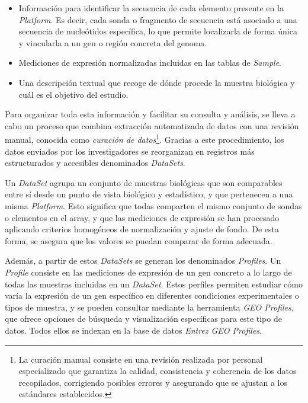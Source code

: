 \begin{itemize}
\item Información para identificar la secuencia de cada elemento presente en la \textit{Platform}. Es decir, cada sonda o fragmento de secuencia está asociado a 
una secuencia de nucleótidos específica, lo que permite localizarla de forma única y vincularla a un gen o región concreta del genoma.
\item Mediciones de expresión normalizadas incluidas en las tablas de \textit{Sample}.
\item Una descripción textual que recoge de dónde procede la muestra biológica y cuál es el objetivo del estudio.
\end{itemize}

Para organizar toda esta información y facilitar su consulta y análisis, se lleva a cabo un proceso que combina extracción automatizada de datos con una revisión 
manual, conocida como \textit{curación de datos}\footnote{La curación manual consiste en una revisión realizada por personal especializado que garantiza la calidad, 
consistencia y coherencia de los datos recopilados, corrigiendo posibles errores y asegurando que se ajustan a los estándares establecidos.}. Gracias a este procedimiento, 
los datos enviados por los investigadores se reorganizan en registros más estructurados y accesibles denominados \textit{DataSets}. \newline

Un \textit{DataSet} agrupa un conjunto de muestras biológicas que son comparables entre sí desde un punto de vista biológico y estadístico, y que pertenecen a una 
misma \textit{Platform}. Esto significa que todas comparten el mismo conjunto de sondas o elementos en el array, y que las mediciones de expresión se han procesado 
aplicando criterios homogéneos de normalización y ajuste de fondo. De esta forma, se asegura que los valores se puedan comparar de forma adecuada. \newline

Además, a partir de estos \textit{DataSets} se generan los denominados \textit{Profiles}. Un \textit{Profile} consiste en las mediciones de expresión de un gen concreto 
a lo largo de todas las muestras incluidas en un \textit{DataSet}. Estos perfiles permiten estudiar cómo varía la expresión de un gen específico en diferentes condiciones 
experimentales o tipos de muestra, y se pueden consultar mediante la herramienta \textit{GEO Profiles}, que ofrece opciones de búsqueda y visualización específicas para 
este tipo de datos. Todos ellos se indexan en la base de datos \textit{Entrez GEO Profiles}. \newline

